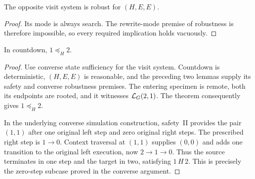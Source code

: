 \begin{lemma}
The opposite visit system is robust for $(H,E,E)$.
\end{lemma}
\begin{proof}
Its mode is always search. The rewrite-mode premise of robustness is
therefore impossible, so every required implication holds vacuously.
\end{proof}

\begin{proposition}
In countdown, $1\preceq_H2$.
\end{proposition}
\begin{proof}
Use converse state sufficiency for the visit system. Countdown is
deterministic, $(H,E,E)$ is reasonable, and the preceding two lemmas
supply its safety and converse robustness premises. The entering
specimen is remote, both its endpoints are rooted, and it witnesses
$\mathcal L_G(2,1)$. The theorem consequently gives $1\preceq_H2$.

In the underlying converse simulation construction, safety~II provides
the pair $(1,1)$ after one original left step and zero original right
steps. The prescribed right step is $1\to0$. Context traversal at
$(1,1)$ supplies $(0,0)$ and adds one transition to the original left
execution, now $2\to1\to0$. Thus the source terminates in one step
and the target in two, satisfying $1\,H\,2$. This is precisely the
zero-step subcase proved in the converse argument.
\end{proof}
